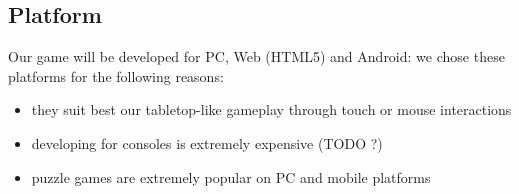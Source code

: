 \subsection{Platform}
Our game will be developed for PC, Web (HTML5) and Android: we chose these platforms for the following reasons:
\begin{itemize}
	\item they suit best our tabletop-like gameplay through touch or mouse interactions
	\item developing for consoles is extremely expensive (TODO ?)
	\item puzzle games are extremely popular on PC and mobile platforms
\end{itemize}

\clearpage